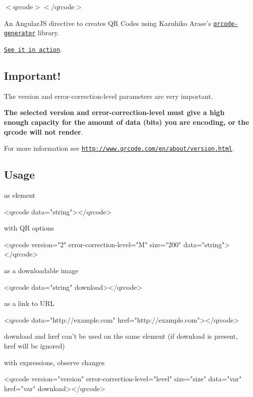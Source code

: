 $<$qrcode$>$$<$/qrcode$>$

An Angular\+JS directive to creates QR Codes using Kazuhiko Arase’s \href{https://github.com/kazuhikoarase/qrcode-generator}{\tt qrcode-\/generator} library.

\href{http://monospaced.github.io/angular-qrcode}{\tt See it in action}.

\subsection*{Important! }

The {\ttfamily version} and {\ttfamily error-\/correction-\/level} parameters are very important.

{\bfseries The selected {\ttfamily version} and {\ttfamily error-\/correction-\/level} must give a high enough capacity for the amount of {\ttfamily data} (bits) you are encoding, or the {\ttfamily qrcode} will not render}.

For more information see \href{http://www.qrcode.com/en/about/version.html}{\tt http\+://www.\+qrcode.\+com/en/about/version.\+html}.

\subsection*{Usage }

as element \begin{DoxyVerb}<qrcode data="string"></qrcode>
\end{DoxyVerb}


with QR options \begin{DoxyVerb}<qrcode version="2" error-correction-level="M" size="200" data="string"></qrcode>
\end{DoxyVerb}


as a downloadable image \begin{DoxyVerb}<qrcode data="string" download></qrcode>
\end{DoxyVerb}


as a link to U\+RL \begin{DoxyVerb}<qrcode data="http://example.com" href="http://example.com"></qrcode>
\end{DoxyVerb}


{\ttfamily download} and {\ttfamily href} can’t be used on the same element (if {\ttfamily download} is present, {\ttfamily href} will be ignored)

with expressions, observe changes \begin{DoxyVerb}<qrcode version="{{version}}" error-correction-level="{{level}}" size="{{size}}" data="{{var}}" href="{{var}}" download></qrcode>
\end{DoxyVerb}


